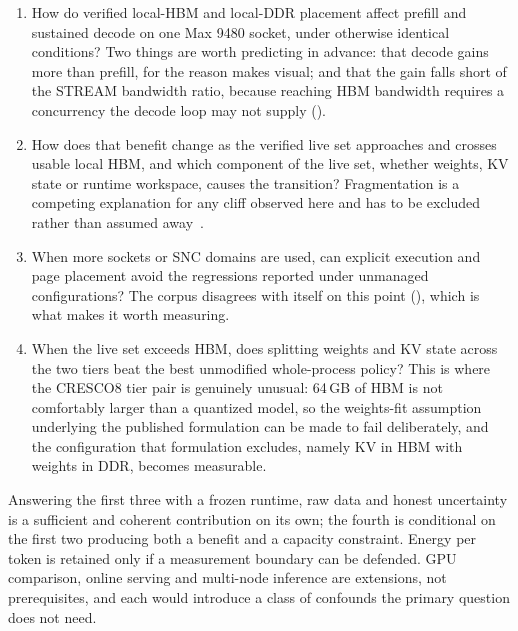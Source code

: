 \begin{enumerate}
  \item How do verified local-HBM and local-DDR placement affect prefill
        and sustained decode on one Max 9480 socket, under otherwise
        identical conditions?  Two things are worth predicting in
        advance: that decode gains more than prefill, for the reason
         makes visual; and that the gain falls
        short of the STREAM bandwidth ratio, because reaching HBM
        bandwidth requires a concurrency the decode loop may not supply
        ().

  \item How does that benefit change as the verified live set approaches
        and crosses usable local HBM, and which component of the live
        set, whether weights, KV state or runtime workspace, causes the
        transition?  Fragmentation is a competing explanation for any
        cliff observed here and has to be excluded rather than assumed
        away~\cite{arif2026inferencescaling}.

  \item When more sockets or SNC domains are used, can explicit
        execution and page placement avoid the regressions reported
        under unmanaged configurations?  The corpus disagrees with
        itself on this point (), which
        is what makes it worth measuring.

  \item When the live set exceeds HBM, does splitting weights and KV
        state across the two tiers beat the best unmodified
        whole-process policy?  This is where the CRESCO8 tier pair is
        genuinely unusual: 64\,GB of HBM is not comfortably larger than
        a quantized model, so the weights-fit assumption underlying the
        published formulation can be made to fail deliberately, and the
        configuration that formulation excludes, namely KV in HBM with
        weights in DDR, becomes measurable.
\end{enumerate}

Answering the first three with a frozen runtime, raw data and honest
uncertainty is a sufficient and coherent contribution on its own; the
fourth is conditional on the first two producing both a benefit and a
capacity constraint.  Energy per token is retained only if a measurement
boundary can be defended.  GPU comparison, online serving and
multi-node inference are extensions, not prerequisites, and each would
introduce a class of confounds the primary question does not need.
